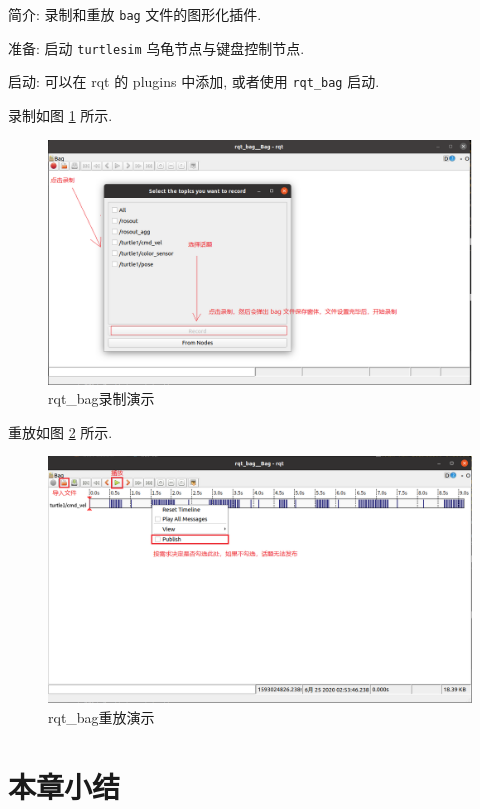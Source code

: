 \documentclass[openany, fontset=windowsold]{ctexbook}
\theoremstyle{kaiti}
\theoremstyle{normal}
\begin{document}
简介: 录制和重放 \verb|bag| 文件的图形化插件.

准备: 启动 \verb|turtlesim| 乌龟节点与键盘控制节点.

启动: 可以在 rqt 的 plugins 中添加, 或者使用 \verb|rqt_bag| 启动.

录制如图 \ref{fig:ros_rqt_bag_record} 所示.

\begin{figure}[!ht]
  \centering
  \includegraphics[width=.9\textwidth]{ros_rqt_bag_record.png}
  \caption{rqt\_bag录制演示}
  \label{fig:ros_rqt_bag_record}
\end{figure}

重放如图 \ref{fig:ros_rqt_bag_replay} 所示.

\begin{figure}[!ht]
  \centering
  \includegraphics[width=.9\textwidth]{ros_rqt_bag_replay.png}
  \caption{rqt\_bag重放演示}
  \label{fig:ros_rqt_bag_replay}
\end{figure}

\section{本章小结}
\end{document}
